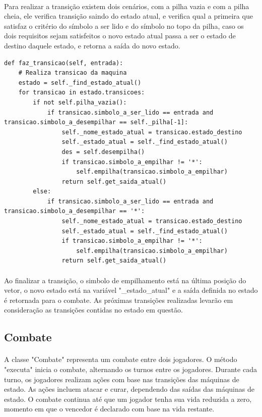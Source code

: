 \documentclass[12pt]{article}
\begin{document}
\paragraph{} Para realizar a transição existem dois cenários, com a pilha vazia e com a pilha cheia, ele verifica transição saindo do estado atual, e verifica qual a primeira que satisfaz o critério do símbolo a ser lido e do símbolo no topo da pilha, caso os dois requisitos sejam satisfeitos o novo estado atual passa a ser o estado de destino daquele estado, e retorna a saída do novo estado.

\begin{verbatim}
def faz_transicao(self, entrada):
    # Realiza transicao da maquina
    estado = self._find_estado_atual()
    for transicao in estado.transicoes:
        if not self.pilha_vazia():
            if transicao.simbolo_a_ser_lido == entrada and transicao.simbolo_a_desempilhar == self._pilha[-1]:
                self._nome_estado_atual = transicao.estado_destino
                self._estado_atual = self._find_estado_atual()
                des = self.desempilha()
                if transicao.simbolo_a_empilhar != '*':
                    self.empilha(transicao.simbolo_a_empilhar)
                return self.get_saida_atual()
        else:
            if transicao.simbolo_a_ser_lido == entrada and transicao.simbolo_a_desempilhar == '*':
                self._nome_estado_atual = transicao.estado_destino
                self._estado_atual = self._find_estado_atual()
                if transicao.simbolo_a_empilhar != '*':
                    self.empilha(transicao.simbolo_a_empilhar)
                return self.get_saida_atual()
\end{verbatim}

\vspace{}
\paragraph{}Ao finalizar a transição, o simbolo de empilhamento está na última posição do vetor, o novo estado está na variável "\_estado\_atual" e a saída definida no estado é retornada para o combate. As próximas transições realizadas levarão em consideração as transições contidas no estado em questão.


\newpage

\subsection{Combate}
\paragraph{}A classe "Combate" representa um combate entre dois jogadores. O método "executa" inicia o combate, alternando os turnos entre os jogadores. Durante cada turno, os jogadores realizam ações com base nas transições das máquinas de estado. As ações incluem atacar e curar, dependendo das saídas das máquinas de estado. O combate continua até que um jogador tenha sua vida reduzida a zero, momento em que o vencedor é declarado com base na vida restante.
\end{document}
